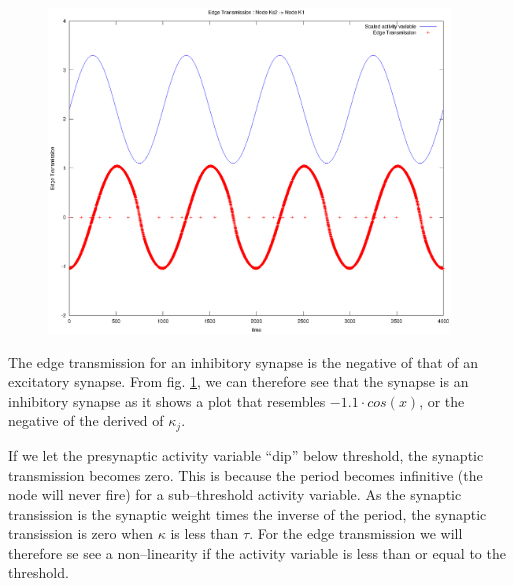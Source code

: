 \begin{figure}[hb!tp]
	\centering
	\includegraphics[width=0.95\textwidth]{./synapticTransmissionPlots/eps_transmissionKappaAboveThreshold.eps} 	
	\caption{ 	
			} %
	\label{figEdgeTransmissionKaboveT}
\end{figure}

			The edge transmission for an inhibitory synapse is the negative of that of an excitatory synapse.
			From fig. \ref{figEdgeTransmissionKaboveT}, we can therefore see that the synapse is an inhibitory synapse as it shows a plot that resembles $ - 1.1 \cdot cos(x)$, 
				or the negative of the derived of $\kappa_j$.

			
			If we let the presynaptic activity variable ``dip'' below threshold, the synaptic transmission becomes zero.
			This is because the period becomes infinitive (the node will never fire) for a sub--threshold activity variable. 
			As the synaptic transission is the synaptic weight times the inverse of the period, the synaptic transission is zero when $\kappa$ is less than $\tau$.
			For the edge transmission we will therefore se see a non--linearity if the activity variable is less than or equal to the threshold.


